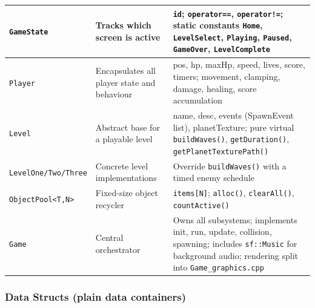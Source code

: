 \documentclass[11pt]{article}
\begin{document}
\begin{table}[htbp]
\begin{tabular}{|l|p{3.2cm}|p{5.8cm}|}
        \hline
        \texttt{GameState} & Tracks which screen is active & \texttt{id}; \texttt{operator==}, \texttt{operator!=}; static constants \texttt{Home}, \texttt{LevelSelect}, \texttt{Playing}, \texttt{Paused}, \texttt{GameOver}, \texttt{LevelComplete} \\
        \hline
        \texttt{Player} & Encapsulates all player state and behaviour & pos, hp, maxHp, speed, lives, score, timers; movement, clamping, damage, healing, score accumulation \\
        \hline
        \texttt{Level} & Abstract base for a playable level & name, desc, events (SpawnEvent list), planetTexture; pure virtual \texttt{buildWaves()}, \texttt{getDuration()}, \texttt{getPlanetTexturePath()} \\
        \hline
        \texttt{LevelOne/Two/Three} & Concrete level implementations & Override \texttt{buildWaves()} with a timed enemy schedule \\
        \hline
        \texttt{ObjectPool<T,N>} & Fixed-size object recycler & \texttt{items[N]}; \texttt{alloc()}, \texttt{clearAll()}, \texttt{countActive()} \\
        \hline
        \texttt{Game} & Central orchestrator & Owns all subsystems; implements init, run, update, collision, spawning; includes \texttt{sf::Music} for background audio; rendering split into \texttt{Game\_graphics.cpp} \\
        \hline
    \end{tabular}
\end{table}

\subsubsection{Data Structs (plain data containers)}
\end{document}
